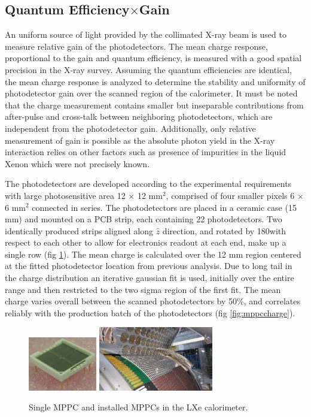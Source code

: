 \subsection{Quantum Efficiency$\times$Gain}
An uniform source of light provided by the collimated X-ray beam is
used to measure relative gain of the photodetectors.  The mean charge
response, proportional to the gain and quantum efficiency, is measured
with a good spatial precision in the X-ray survey.  Assuming the
quantum efficiencies are identical, the mean charge response is
analyzed to determine the stability and uniformity of photodetector
gain over the scanned region of the calorimeter.  It must be noted
that the charge measurement contains smaller but inseparable
contributions from after-pulse and cross-talk between neighboring
photodetectors, which are independent from the photodetector gain.
Additionally, only relative measurement of gain is possible as the
absolute photon yield in the X-ray interaction relies on other factors
such as presence of impurities in the liquid Xenon which were not
precisely known. 


The photodetectors are developed according to the experimental
requirements with large photosensitive area 12 $\times$ 12 mm$^2$,
comprised of four  smaller pixels 6 $\times$ 6 mm$^2$ connected in
series.  The photodetectors are placed in a ceramic case (15 mm) and
mounted on a PCB strip, each containing 22 photodetectors.  Two
identically produced strips aligned along $\hat{z}$ direction, and
rotated by 180\degree with respect to each other to allow for
electronics readout at each end, make up a single row (fig 
\ref{fig:mppc}).
The mean charge  is calculated over the 12 mm region centered at the
fitted photodetector location from previous analysis.  Due to long
tail in the charge distribution an iterative gaussian fit is used,
initially over the entire range and then restricted to the two sigma
region of the first fit.  The mean charge varies overall between the
scanned photodetectors by 50\%, and correlates reliably with the
production batch of the photodetectors (fig \ref{fig:mppccharge}). 

\begin{figure}
\includegraphics[width=3cm]{plots/single_mppc.jpg}
\includegraphics[width=5cm]{plots/CFRP_spacer_MPPC.jpg}
\caption{Single MPPC and installed MPPCs in the LXe calorimeter.}
\label{fig:mppc} 
\end{figure}

